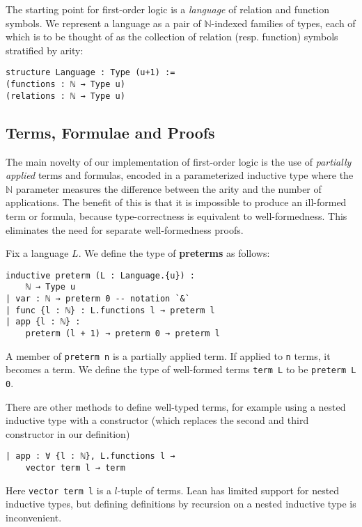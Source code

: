 \documentclass[sigplan,10pt,review, anonymous]{acmart}
\newcommand{\lil}{\lstinline}
\newcommand{\N}{\mathbb{N}}
\theoremstyle{definition}
\newcommand{\lil}{\lstinline}
\begin{document}
The starting point for first-order logic is a \emph{language} of relation and function symbols.
We represent a language as a pair of $\N$-indexed families of types, each of which is to be thought of as the collection of relation (resp. function) symbols stratified by arity:
\begin{lstlisting}
structure Language : Type (u+1) :=
(functions : ℕ → Type u)
(relations : ℕ → Type u)
\end{lstlisting}

\subsection{Terms, Formulae and Proofs}
\label{subsection:fol:terms}
The main novelty of our implementation of first-order logic is the use of \emph{partially applied} terms and formulas, encoded in a parameterized inductive type where the $\N$ parameter measures the difference between the arity and the number of applications.
The benefit of this is that it is impossible to produce an ill-formed term or formula, because type-correctness is equivalent to well-formedness.
This eliminates the need for separate well-formedness proofs.

Fix a language $L$. We define the type of \textbf{preterms} as follows:
\begin{lstlisting}
inductive preterm (L : Language.{u}) :
    ℕ → Type u
| var : ℕ → preterm 0 -- notation `&`
| func {l : ℕ} : L.functions l → preterm l
| app {l : ℕ} :
    preterm (l + 1) → preterm 0 → preterm l
\end{lstlisting}
A member of \lil{preterm n} is a partially applied term.
If applied to \lil{n} terms, it becomes a term.
We define the type of well-formed terms \lil{term L} to be \lil{preterm L 0}.

There are other methods to define well-typed terms, for example using a nested inductive type with a constructor (which replaces the second and third constructor in our definition)
\begin{lstlisting}
| app : ∀ {l : ℕ}, L.functions l →
    vector term l → term
\end{lstlisting}
Here \lil{vector term l} is a $l$-tuple of terms.
Lean has limited support for nested inductive types, but defining definitions by recursion on a nested inductive type is inconvenient.
\end{document}
